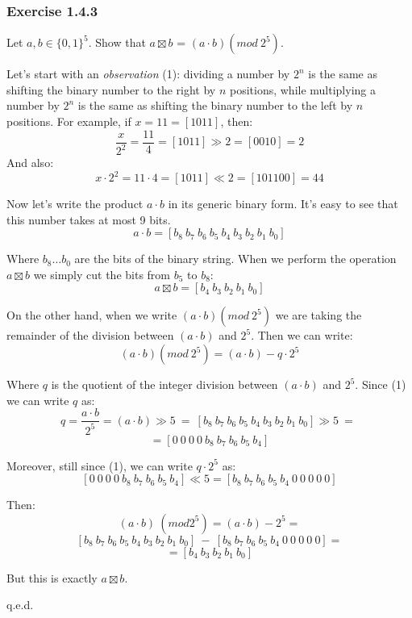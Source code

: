 \subsubsection*{Exercise 1.4.3}

  Let $a, b \in \{0, 1\}^{5}$.
  Show that $a \boxtimes b$ = $(a \cdot b) (mod\ 2^{5})$.

  \vspace{20pt}

  Let's start with an \emph{observation} (1): dividing a number by $2^{n}$ is
  the same as shifting the binary number to the right by $n$
  positions, while multiplying a number by $2^{n}$ is the same as
  shifting the binary number to the left by $n$ positions.
  For example, if $x = 11 = [1011]$, then:
  $$
	\frac{x}{2^{2}} = \frac{11}{4} = [1011] \gg 2 = [0010] = 2
  $$
  And also:
  $$
	x \cdot 2^{2} = 11\cdot 4 = [1011] \ll 2 = [101100] = 
	44
  $$

  Now let's write the product $a \cdot b$ in its generic binary form. 
  It's easy to see that this number takes at most 9 bits.
  $$
	a \cdot b = 
	[b_{8}\ b_{7}\ b_{6}\ b_{5}\ b_{4}\ b_{3}\ b_{2}\ b_{1}\ b_{0}]
  $$

  Where $b_{8} \dots b_{0}$ are the bits of the binary string. 
  When we perform the operation $a \boxtimes b$ we simply cut the
  bits from $b_{5}$ to $b_{8}$:
  $$
	a \boxtimes b = [b_{4}\ b_{3}\ b_{2}\ b_{1}\ b_{0}]
  $$

  On the other hand, when we write $(a \cdot b) (mod \ 2^{5})$ we are
  taking the remainder of the division between $(a \cdot b)$ and
  $2^{5}$. Then we can write:
  $$
	(a \cdot b) (mod \ 2^{5}) = (a \cdot b) - q\cdot 2^{5}
  $$

  Where $q$ is the quotient of the integer division between $(a \cdot
  b)$ and $2^{5}$. 
  Since (1) we can write $q$ as:
  $$
	q = \frac{a \cdot b}{2^{5}} = (a \cdot b) \gg 5 ~ = ~
	[b_{8}\ b_{7}\ b_{6}\ b_{5}\ b_{4}\ b_{3}\ b_{2}\ b_{1}\
	b_{0}] \gg 5 ~ = ~ 
  $$
  $$
	= [0\ 0\ 0\ 0\ b_{8}\ b_{7}\ b_{6}\ b_{5}\ b_{4}]
  $$

  Moreover, still since (1), we can write $q \cdot 2^{5}$ as:
  $$
	[0\ 0\ 0\ 0\ b_{8}\ b_{7}\ b_{6}\ b_{5}\ b_{4}] \ll 5 = 
	[b_{8}\ b_{7}\ b_{6}\ b_{5}\ b_{4}\ 0\ 0\ 0\ 0\ 0]
  $$

  Then:
  $$
	(a \cdot b)\ (mod 2^{5}) = (a \cdot b) - 2^{5} =
  $$
  $$
	[b_{8}\ b_{7}\ b_{6}\ b_{5}\ b_{4}\ b_{3}\ b_{2}\ b_{1}\ b_{0}] 
	~ - ~ [b_{8}\ b_{7}\ b_{6}\ b_{5}\ b_{4}\ 0\ 0\ 0\ 0\ 0] =
  $$
  $$
	= [b_{4}\ b_{3}\ b_{2}\ b_{1}\ b_{0}]
  $$

  But this is exactly $a \boxtimes b$.

  \begin{flushright}
	q.e.d.
  \end{flushright}
  
  

